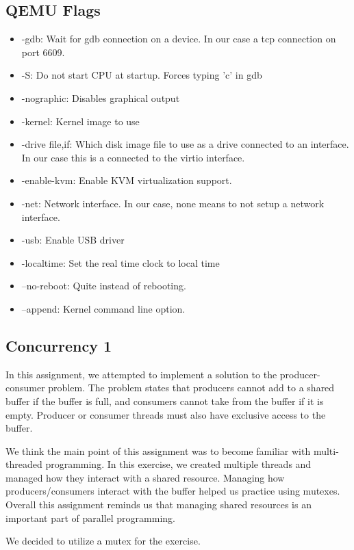 \documentclass[draftclsnofoot, onecolumn, 10pt]{IEEEtran}
\begin{document}
\subsection{QEMU Flags}
\begin{itemize}
  \item -gdb: Wait for gdb connection on a device. In our case a tcp connection on port 6609.
  \item -S: Do not start CPU at startup. Forces typing 'c' in gdb
  \item -nographic: Disables graphical output
  \item -kernel: Kernel image to use
  \item -drive file,if: Which disk image file to use as a drive connected to an interface. In our case this is a connected to the virtio interface.
  \item -enable-kvm: Enable KVM virtualization support.
  \item -net: Network interface. In our case, none means to not setup a network interface.
  \item -usb: Enable USB driver
  \item -localtime: Set the real time clock to local time
  \item --no-reboot: Quite instead of rebooting.
  \item --append: Kernel command line option.
\end{itemize}
\subsection{Concurrency 1}
In this assignment, we attempted to implement a solution to the producer-consumer problem. The problem states that producers cannot
add to a shared buffer if the buffer is full, and consumers cannot take from the buffer if it is empty. Producer or consumer threads
must also have exclusive access to the buffer.

We think the main point of this assignment was to become familiar with multi-threaded programming. In this exercise, we
created multiple threads and managed how they interact with a shared resource. Managing how producers/consumers interact
with the buffer helped us practice using mutexes. Overall this assignment reminds us that managing shared resources is an
important part of parallel programming.

We decided to utilize a mutex for the exercise.



%
\end{document}
